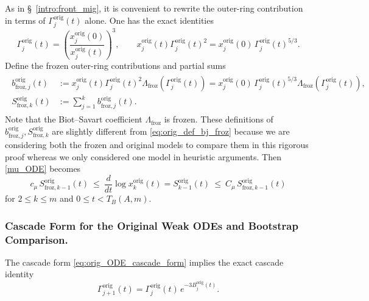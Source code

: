 \documentclass[reqno,11pt]{amsart}
\begin{document}
As in \S~\ref{intro:front_mig}, it is convenient to rewrite the outer-ring contribution in terms of
$\Gamma_j^{\mathrm{orig}}(t)$ alone.  One has the exact identities
\begin{equation*}
\Gamma_j^{\mathrm{orig}}(t)
=\left(\frac{x_j^{\mathrm{orig}}(0)}{x_j^{\mathrm{orig}}(t)}\right)^{3},
\qquad
x_j^{\mathrm{orig}}(t)\Gamma_j^{\mathrm{orig}}(t)^2
= x_j^{\mathrm{orig}}(0)\,\Gamma_j^{\mathrm{orig}}(t)^{5/3}.
\end{equation*}
Define the frozen outer-ring contributions and partial sums
\begin{align*}
\begin{aligned}
b_{\mathrm{froz},j}^{\mathrm{orig}}(t)&:=x_j^{\mathrm{orig}}(t)\Gamma_j^{\mathrm{orig}}(t)^2\Lambda_{\mathrm{froz}}(\Gamma_j^{\mathrm{orig}}(t))
= x_j^{\mathrm{orig}}(0)\,\Gamma_j^{\mathrm{orig}}(t)^{5/3}\Lambda_{\mathrm{froz}}(\Gamma_j^{\mathrm{orig}}(t)),
\\
S_{\mathrm{froz},k}^{\mathrm{orig}}(t)&:=\sum_{j=1}^{k} b_{\mathrm{froz},j}^{\mathrm{orig}}(t).
\end{aligned}
\end{align*}
Note that the Biot--Savart coefficient $\Lambda_{\mathrm{froz}}$ is frozen. These definitions of $b_{\mathrm{froz},j}^{\mathrm{orig}}, S_{\mathrm{froz},k}^{\mathrm{orig}}$ are slightly different from \eqref{eq:orig_def_bj_froz} because we are considering both the frozen and original models  to compare them in this rigorous proof whereas we only considered one model in heuristic arguments.
Then \eqref{mu_ODE} becomes
\begin{equation*}
c_\mu\,S_{\mathrm{froz},k-1}^{\mathrm{orig}}(t)
\ \leq\
\frac{d}{dt}\log x_k^{\mathrm{orig}}(t)=S_{k-1}^{\mathrm{orig}}(t)
\ \leq\
C_\mu\,S_{\mathrm{froz},k-1}^{\mathrm{orig}}(t)
\end{equation*}
for $ 2\le k\le m$ and $ 0\le t<T_B(A,m).$



\subsubsection{Cascade Form for the Original Weak ODEs and Bootstrap Comparison.}
\label{subsec:boot_comp}
The cascade form \eqref{eq:orig_ODE_cascade_form} implies the exact cascade identity
\begin{equation}
\label{eq:Gamma_cascade_orig}
\Gamma_{j+1}^{\mathrm{orig}}(t)=\Gamma_j^{\mathrm{orig}} (t)\,e^{-3B_j^{\mathrm{orig}}(t)}.
\end{equation}
\end{document}
